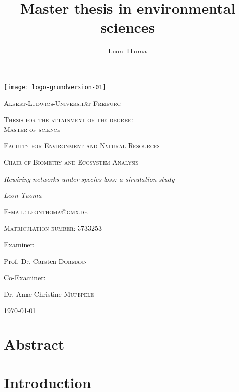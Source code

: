 \documentclass[12pt,a4paper]{article}
\author{Leon Thoma}
\title{Master thesis in environmental sciences}
\begin{document}
\begin{titlepage}
	\centering
	\texttt{[image: logo-grundversion-01]}\par\vspace{1cm}
	{\scshape\large Albert-Ludwigs-Universität Freiburg\par}
	\vspace{1.25cm}
	{\scshape\large Thesis for the attainment of the degree:\\ Master of science\par}
	\vspace{.75cm}
	{\scshape\large Faculty for Environment and Natural Resources\par}
	\vspace{.75cm}
	{\scshape\large Chair of Biometry and Ecosystem Analysis\par}
	\vspace{.75cm}
	{\Large\itshape Rewiring networks under species loss: a simulation
study
\par}
	\vspace{.75cm}
	{\Large\itshape Leon Thoma\par}
	\vspace{.25cm}
	{\scshape\normalsize E-mail: leonthoma@gmx.de\par}
	\vspace{.15cm}
	{\scshape\normalsize Matriculation number: 3733253\par}
	\vspace{.75cm}
	\large Examiner:\par
	\large Prof. Dr. Carsten  \textsc{Dormann} \par
	\vspace{.5cm}
	\large Co-Examiner:\par
	\large Dr. Anne-Christine \textsc{Mupepele}
	\vfill

	{\large \today\par}
\end{titlepage}
	\tableofcontents
	\newpage	
	
\listoffigures
\listoftables
	\section{Abstract} 

\newpage%
%
%
\section{Introduction}
\end{document}
